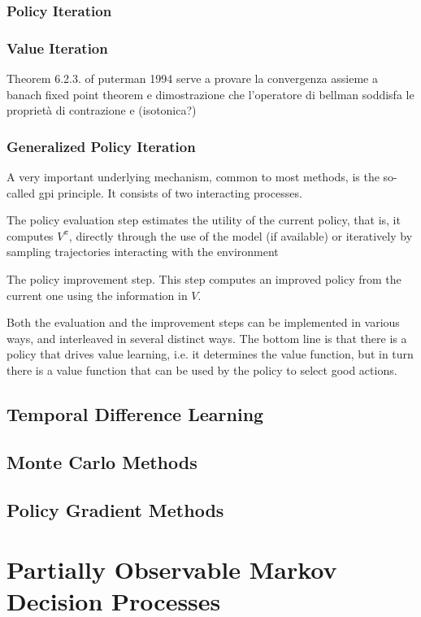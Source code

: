 \documentclass[a4paper,11pt]{report}
\theoremstyle{definition}
\theoremstyle{plain}
\theoremstyle{remark}  %
\begin{document}
\subsection{Policy Iteration}

\subsection{Value Iteration}

Theorem 6.2.3. of puterman 1994 serve a provare la convergenza assieme a banach fixed point theorem 
e dimostrazione che l'operatore di bellman soddisfa le proprietà di contrazione e (isotonica?)


\subsection{Generalized Policy Iteration}
A very important underlying mechanism, common to most methods, is the so-called \gls{gpi} principle. 
It consists of two interacting processes. 

The policy evaluation step estimates the utility
of the current policy, that is, it computes $V^{\pi}$, directly through the use of the model (if available)
or iteratively by sampling trajectories interacting with the environment

The policy improvement step.  
This step computes an improved policy from the current one using the information in $V$. 

Both the evaluation and the improvement steps can be implemented in
various ways, and interleaved in several distinct ways. The bottom line is that there
is a policy that drives value learning, i.e. it determines the value function, but in
turn there is a value function that can be used by the policy to select good actions.



\section{Temporal Difference Learning}
\section{Monte Carlo Methods}
\section{Policy Gradient Methods}


\chapter{Partially Observable Markov Decision Processes}
\end{document}
